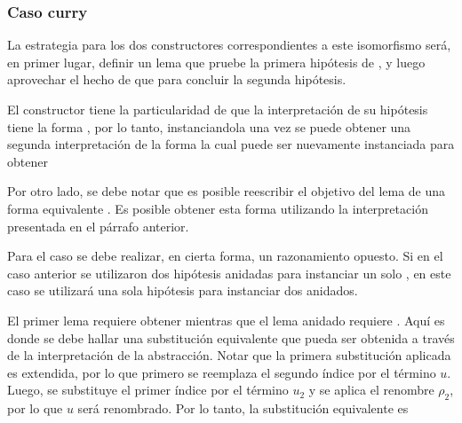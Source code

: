 \subsubsection{Caso curry}

La estrategia para los dos constructores correspondientes a este isomorfismo será, en primer lugar, definir un lema que pruebe la primera hipótesis de , y luego aprovechar el hecho de que
  
para concluir la segunda hipótesis.

El constructor  tiene la particularidad de que la interpretación de su hipótesis tiene la forma 
, por lo tanto, instanciandola una vez se puede obtener una segunda interpretación de la forma
la cual puede ser nuevamente instanciada para obtener

Por otro lado, se debe notar que es posible reescribir el objetivo del lema de una forma equivalente
\subst
{}
{}.
Es posible obtener esta forma utilizando la interpretación presentada en el párrafo anterior.


Para el caso  se debe realizar, en cierta forma, un razonamiento opuesto.
Si en el caso anterior se utilizaron dos hipótesis anidadas para instanciar un solo , en este caso se utilizará una sola hipótesis para instanciar dos  anidados.

El primer lema requiere obtener
\subst
{ }
{}
mientras que el lema anidado requiere
\subst
{}
{}.
Aquí es donde se debe hallar una substitución equivalente que pueda ser obtenida a través de la interpretación de la abstracción.
Notar que la primera substitución aplicada es extendida, por lo que primero se reemplaza el segundo índice por el término $u$.
Luego, se substituye el primer índice por el término $u_2$ y se aplica el renombre $\rho_2$, por lo que $u$ será renombrado.
Por lo tanto, la substitución equivalente es


